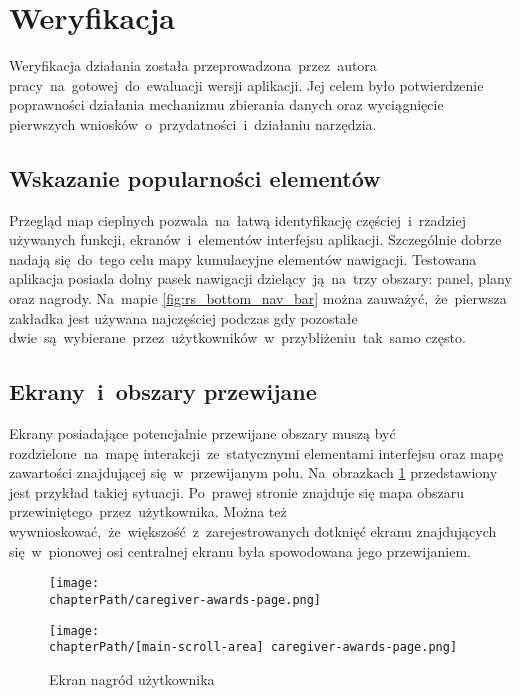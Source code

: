 \section{Weryfikacja}
Weryfikacja działania została przeprowadzona~przez~autora pracy~na~gotowej~do~ewaluacji wersji aplikacji. Jej celem było potwierdzenie poprawności działania mechanizmu zbierania danych oraz wyciągnięcie pierwszych wniosków~o~przydatności~i~działaniu narzędzia.

\subsection{Wskazanie popularności elementów}
Przegląd map cieplnych pozwala~na~łatwą identyfikację częściej~i~rzadziej używanych funkcji, ekranów~i~elementów interfejsu aplikacji. Szczególnie dobrze nadają się~do~tego celu mapy kumulacyjne elementów nawigacji. Testowana aplikacja posiada dolny pasek nawigacji dzielący~ją~na~trzy obszary: panel, plany oraz nagrody. Na~mapie \ref{fig:rs_bottom_nav_bar} można zauważyć,~że~pierwsza zakładka jest używana najczęściej podczas gdy pozostałe dwie~są~wybierane~przez~użytkowników~w~przybliżeniu~tak~samo często.

\bigskip
{}

\subsection{Ekrany~i~obszary przewijane}
Ekrany posiadające potencjalnie przewijane obszary muszą być rozdzielone~na~mapę interakcji~ze~statycznymi elementami interfejsu oraz mapę zawartości znajdującej się~w~przewijanym polu. Na~obrazkach \ref{fig:rs_panel_parts} przedstawiony jest przykład takiej sytuacji. Po~prawej stronie znajduje się mapa obszaru przewiniętego~przez~użytkownika. Można też wywnioskować,~że~większość~z~zarejestrowanych dotknięć ekranu znajdujących się~w~pionowej osi centralnej ekranu była spowodowana jego przewijaniem. 

\bigskip
\begin{figure}[H]
\centering
\begin{minipage}{.35\textwidth}
	\centering
	\texttt{[image: \\chapterPath/caregiver-awards-page.png]}
\end{minipage}
\begin{minipage}{.33\textwidth}
	\centering
	\texttt{[image: \\chapterPath/[main-scroll-area] caregiver-awards-page.png]}
\end{minipage}
\bigskip
\caption{Ekran nagród użytkownika}
\label{fig:rs_panel_parts}
\end{figure}

